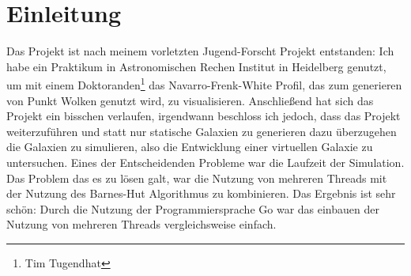 \section{Einleitung}
Das Projekt ist nach meinem vorletzten Jugend-Forscht Projekt entstanden: Ich
habe ein Praktikum in Astronomischen Rechen Institut in Heidelberg genutzt, um
mit einem Doktoranden\footnote{Tim Tugendhat} das Navarro-Frenk-White Profil,
das zum generieren von Punkt Wolken genutzt wird, zu visualisieren. Anschließend
hat sich das Projekt ein bisschen verlaufen, irgendwann beschloss ich jedoch,
dass das Projekt weiterzuführen und statt nur statische Galaxien zu generieren
dazu überzugehen die Galaxien zu simulieren, also die Entwicklung einer
virtuellen Galaxie zu untersuchen.  Eines der Entscheidenden Probleme war die
Laufzeit der Simulation. Das Problem das es zu lösen galt, war die Nutzung von
mehreren Threads mit der Nutzung des Barnes-Hut Algorithmus zu kombinieren.
Das Ergebnis ist sehr schön: Durch die Nutzung der Programmiersprache Go
war das einbauen der Nutzung von mehreren Threads vergleichsweise einfach.

